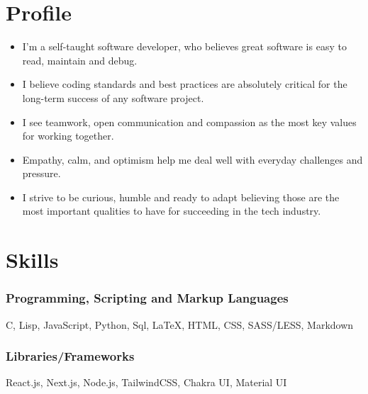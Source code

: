 \documentclass[11pt, oneside, a4paper, titlepage]{article}
\newcommand\skillsVSpace{\vspace{-0.3cm}}
\begin{document}
\begin{tcolorbox}
  \begin{minipage}[t]{8cm}
    \vspace*{-0.5cm}
    \begin{tcolorbox}[grow to left by=0.6cm,colback=gray!25,colframe=white]

      \section*{Profile}
      \begin{itemize}
        \item{
      I'm a self-taught software developer,
      who believes great software is easy to read,
      maintain and debug.
          }
       \item{
     I believe coding standards and best practices are absolutely critical
     for the long-term success of any software project.
         }
        \item{
      I see teamwork, open communication and compassion
      as the most key values for working together.
          }
        \item{
      Empathy, calm, and optimism
      help me deal well with everyday challenges and pressure.
        }
      \item{
      I strive to be curious, humble and ready to adapt
      believing those are the most important qualities to have
      for succeeding in the tech industry.
        }
      \end{itemize}


      \section*{Skills}
        \subsubsection{Programming, Scripting and Markup Languages}
        C, Lisp, JavaScript, Python, Sql, {\LaTeX}, HTML, CSS, SASS/LESS, Markdown
        \skillsVSpace
        \subsubsection{Libraries/Frameworks}
        React.js, Next.js, Node.js, TailwindCSS, Chakra UI, Material UI


\end{tcolorbox}
\end{minipage}
\end{tcolorbox}
\end{document}
